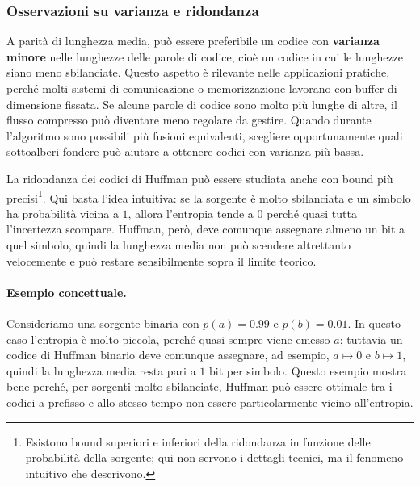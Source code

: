 \documentclass{article}
\theoremstyle{definition}
\numberwithin{equation}{section}
\begin{document}
\subsubsection{Osservazioni su varianza e ridondanza}
A parità di lunghezza media, può essere preferibile un codice con \textbf{varianza minore} nelle lunghezze delle parole di codice, cioè un codice in cui le lunghezze siano meno sbilanciate. Questo aspetto è rilevante nelle applicazioni pratiche, perché molti sistemi di comunicazione o memorizzazione lavorano con buffer di dimensione fissata. Se alcune parole di codice sono molto più lunghe di altre, il flusso compresso può diventare meno regolare da gestire. Quando durante l'algoritmo sono possibili più fusioni equivalenti, scegliere opportunamente quali sottoalberi fondere può aiutare a ottenere codici con varianza più bassa.

La ridondanza dei codici di Huffman può essere studiata anche con bound più precisi\footnote{Esistono bound superiori e inferiori della ridondanza in funzione delle probabilità della sorgente; qui non servono i dettagli tecnici, ma il fenomeno intuitivo che descrivono.}. Qui basta l'idea intuitiva: se la sorgente è molto sbilanciata e un simbolo ha probabilità vicina a $1$, allora l'entropia tende a $0$ perché quasi tutta l'incertezza scompare. Huffman, però, deve comunque assegnare almeno un bit a quel simbolo, quindi la lunghezza media non può scendere altrettanto velocemente e può restare sensibilmente sopra il limite teorico.

\paragraph{Esempio concettuale.}
Consideriamo una sorgente binaria con $p(a)=0.99$ e $p(b)=0.01$. In questo caso l'entropia è molto piccola, perché quasi sempre viene emesso $a$; tuttavia un codice di Huffman binario deve comunque assegnare, ad esempio, $a\mapsto 0$ e $b\mapsto 1$, quindi la lunghezza media resta pari a $1$ bit per simbolo. Questo esempio mostra bene perché, per sorgenti molto sbilanciate, Huffman può essere ottimale tra i codici a prefisso e allo stesso tempo non essere particolarmente vicino all'entropia.

\end{document}
